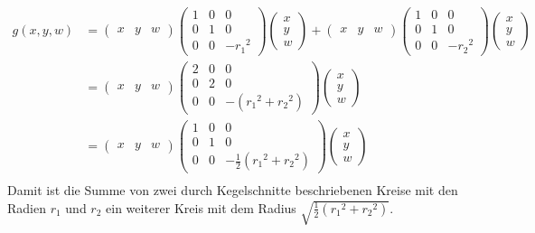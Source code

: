\begin{align*}
  g(x, y, w) &= \left(\begin{matrix}x &y& w\end{matrix}\right)\left(\begin{matrix}1&0&0\\0&1&0\\0&0&-{r_1}^2\end{matrix}\right)\left(\begin{matrix}x\\y\\w\end{matrix}\right) +
  \left(\begin{matrix}x &y& w\end{matrix}\right)\left(\begin{matrix}1&0&0\\0&1&0\\0&0&-{r_2}^2\end{matrix}\right)\left(\begin{matrix}x\\y\\w\end{matrix}\right)\\
             &= \left(\begin{matrix}x &y& w\end{matrix}\right)\left(\begin{matrix}2&0&0\\0&2&0\\0&0&-({r_1}^2+{r_2}^2)\end{matrix}\right)\left(\begin{matrix}x\\y\\w\end{matrix}\right)\\
             &= \left(\begin{matrix}x &y& w\end{matrix}\right)\left(\begin{matrix}1&0&0\\0&1&0\\0&0&-\frac{1}{2}({r_1}^2+{r_2}^2)\end{matrix}\right)\left(\begin{matrix}x\\y\\w\end{matrix}\right)\\
\end{align*}
Damit ist die Summe von zwei durch Kegelschnitte beschriebenen Kreise mit den Radien $r_1$ und $r_2$ ein weiterer Kreis mit dem Radius $\sqrt{\frac{1}{2}({r_1}^2+{r_2}^2)}$.
